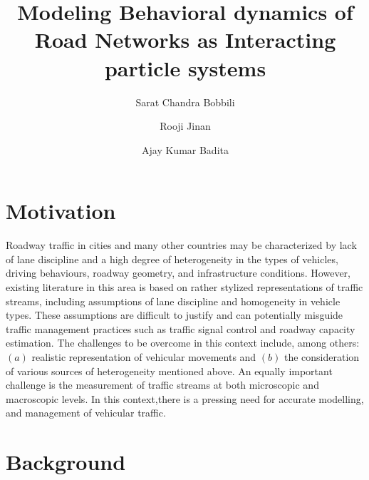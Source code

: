 \documentclass[a4paper,12pt]{scrartcl}
\date{}
\begin{document}
\title{Modeling Behavioral dynamics of Road Networks as Interacting particle systems}
\author{
Sarat Chandra Bobbili\\
\and
Rooji Jinan\\
\and
Ajay Kumar Badita\\
}
\maketitle
\section*{Motivation}

Roadway traffic in cities and many other countries may be characterized by lack of lane discipline and a high degree of heterogeneity in the types of vehicles, driving behaviours, roadway geometry, and infrastructure conditions.
However, existing literature in this area is based on rather stylized representations of traffic streams, including assumptions of lane discipline and homogeneity in vehicle types.
These assumptions are difficult to justify and can potentially misguide traffic management practices such as traffic signal control and roadway capacity estimation.
The challenges to be overcome in this context include, among others: $(a)$ realistic representation of vehicular movements and $(b)$ the consideration of various sources of heterogeneity mentioned above.
An equally important challenge is the measurement of traffic streams at both microscopic and macroscopic levels.
In this context,there is a pressing need for accurate modelling, and management of vehicular traffic.


\section*{Background}
\end{document}
